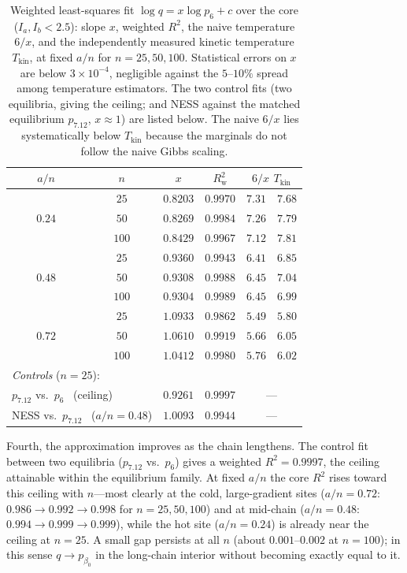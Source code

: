 \documentclass[11pt,a4paper]{article}
\theoremstyle{definition}
\numberwithin{equation}{section}   %
\begin{document}
\begin{table}[ht]\centering
\begin{tabular}{ccccc}
\hline
$a/n$ & $n$ & $x$ & $R^2_{\mathrm w}$ & $6/x$ \quad $T_{\mathrm{kin}}$ \\
\hline
       & $25$  & $0.8203$ & $0.9970$ & $7.31\quad 7.68$ \\
$0.24$ & $50$  & $0.8269$ & $0.9984$ & $7.26\quad 7.79$ \\
       & $100$ & $0.8429$ & $0.9967$ & $7.12\quad 7.81$ \\
\hline
       & $25$  & $0.9360$ & $0.9943$ & $6.41\quad 6.85$ \\
$0.48$ & $50$  & $0.9308$ & $0.9988$ & $6.45\quad 7.04$ \\
       & $100$ & $0.9304$ & $0.9989$ & $6.45\quad 6.99$ \\
\hline
       & $25$  & $1.0933$ & $0.9862$ & $5.49\quad 5.80$ \\
$0.72$ & $50$  & $1.0610$ & $0.9919$ & $5.66\quad 6.05$ \\
       & $100$ & $1.0412$ & $0.9980$ & $5.76\quad 6.02$ \\
\hline
\multicolumn{5}{l}{\emph{Controls} ($n=25$):}\\
\multicolumn{2}{l}{$p_{7.12}$ vs.\ $p_6$ \ (ceiling)}      & $0.9261$ & $0.9997$ & --- \\
\multicolumn{2}{l}{NESS vs.\ $p_{7.12}$ \ ($a/n{=}0.48$)}  & $1.0093$ & $0.9944$ & --- \\
\hline
\end{tabular}
\caption{Weighted least-squares fit $\log q=x\log p_6+c$ over the core
($I_a,I_b<2.5$): slope $x$, weighted $R^2$, the naive temperature $6/x$, and
the independently measured kinetic temperature $T_{\mathrm{kin}}$, at fixed
$a/n$ for $n=25,50,100$. Statistical errors on $x$ are below $3\times10^{-4}$,
negligible against the $5$--$10\%$ spread among temperature estimators. The
two control fits (two equilibria, giving the ceiling; and NESS against the
matched equilibrium $p_{7.12}$, $x\approx1$) are listed below. The naive
$6/x$ lies systematically below $T_{\mathrm{kin}}$ because the marginals do not
follow the naive Gibbs scaling.}
\label{tab:lte}
\end{table}

Fourth, the approximation improves as the chain lengthens. The control fit
between two equilibria ($p_{7.12}$ vs.\ $p_6$) gives a weighted $R^2=0.9997$,
the ceiling attainable within the equilibrium family. At fixed $a/n$ the core
$R^2$ rises toward this ceiling with $n$---most clearly at the cold,
large-gradient sites ($a/n=0.72$: $0.986\to0.992\to0.998$ for $n=25,50,100$)
and at mid-chain ($a/n=0.48$: $0.994\to0.999\to0.999$), while the hot site
($a/n=0.24$) is already near the ceiling at $n=25$. A small gap persists at
all $n$ (about $0.001$--$0.002$ at $n=100$); in this sense $q\to p_{\beta_0}$
in the long-chain interior without becoming exactly equal to it.
\end{document}
